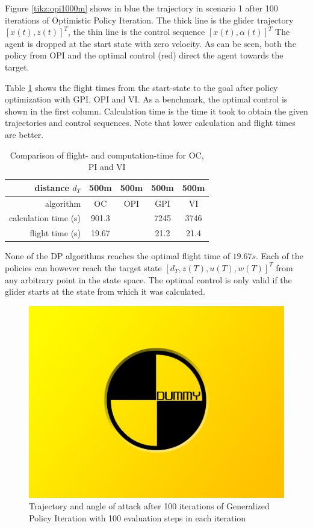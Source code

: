 Figure \ref{tikz:opi1000m} shows in blue the trajectory in scenario 1 after 100 iterations of Optimistic Policy Iteration. The thick line is the glider trajectory $[x(t),z(t)]^T$, the thin line is the control sequence $[x(t),\alpha(t)]^T$ The agent is dropped at the start state with zero velocity. As can be seen, both the policy from OPI and the optimal control (red) direct the agent towards the target.

Table \ref{tab:2d_flight_times} shows the flight times from the start-state to the goal after policy optimization with GPI, OPI and VI. As a benchmark, the optimal control  is shown in the first column. Calculation time is the time it took to obtain the given trajectories and control sequences. Note that lower calculation and flight times are better.

\begin{table}[h]
	\begin{center}
		\begin{tabular}{r|c c c c}
			distance $d_T$ & 500m & 500m & 500m & 500m \\ \hline 
			algorithm & OC & OPI & GPI & VI \\
			calculation time (s) & 901.3 & & 7245 & 3746 \\
			flight time (s) & 19.67 & & 21.2 & 21.4
		\end{tabular}
		\caption{Comparison of flight- and computation-time for OC, PI and VI}
		\label{tab:2d_flight_times}
	\end{center}
\end{table}

None of the DP algorithms reaches the optimal flight time of $19.67s$. Each of the policies can however reach the target state $[d_T,z(T),u(T),w(T)]^T$ from any arbitrary point in the state space. The optimal control is only valid if the glider starts at the state from which it was calculated.

\begin{figure}[h]
	\includegraphics[width=\textwidth]{src/pics/dummy.jpg}
	\caption{Trajectory and angle of attack after 100 iterations of Generalized Policy Iteration with 100 evaluation steps in each iteration}
	\label{fig:2d_flighttimes_GPI_OPI}
\end{figure}

